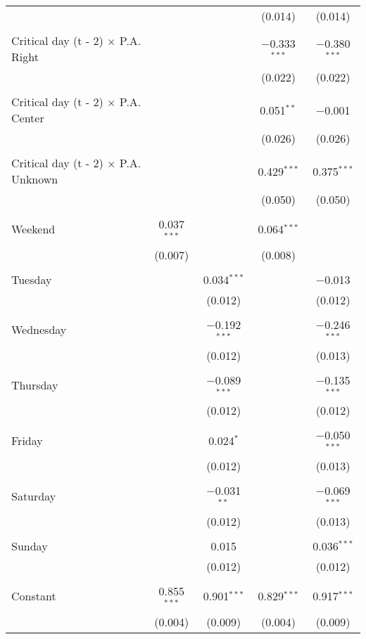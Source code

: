 \documentclass[
]{article}
\begin{document}
\begin{table}[!htbp]
{\begin{tabular}{@{\extracolsep{5pt}}lcccc}
  &  &  & (0.014) & (0.014) \\ 
  & & & & \\ 
 Critical day (t - 2) $\times$ P.A. Right &  &  & $-$0.333$^{***}$ & $-$0.380$^{***}$ \\ 
  &  &  & (0.022) & (0.022) \\ 
  & & & & \\ 
 Critical day (t - 2) $\times$ P.A. Center &  &  & 0.051$^{**}$ & $-$0.001 \\ 
  &  &  & (0.026) & (0.026) \\ 
  & & & & \\ 
 Critical day (t - 2) $\times$ P.A. Unknown &  &  & 0.429$^{***}$ & 0.375$^{***}$ \\ 
  &  &  & (0.050) & (0.050) \\ 
  & & & & \\ 
 Weekend & 0.037$^{***}$ &  & 0.064$^{***}$ &  \\ 
  & (0.007) &  & (0.008) &  \\ 
  & & & & \\ 
 Tuesday &  & 0.034$^{***}$ &  & $-$0.013 \\ 
  &  & (0.012) &  & (0.012) \\ 
  & & & & \\ 
 Wednesday &  & $-$0.192$^{***}$ &  & $-$0.246$^{***}$ \\ 
  &  & (0.012) &  & (0.013) \\ 
  & & & & \\ 
 Thursday &  & $-$0.089$^{***}$ &  & $-$0.135$^{***}$ \\ 
  &  & (0.012) &  & (0.012) \\ 
  & & & & \\ 
 Friday &  & 0.024$^{*}$ &  & $-$0.050$^{***}$ \\ 
  &  & (0.012) &  & (0.013) \\ 
  & & & & \\ 
 Saturday &  & $-$0.031$^{**}$ &  & $-$0.069$^{***}$ \\ 
  &  & (0.012) &  & (0.013) \\ 
  & & & & \\ 
 Sunday &  & 0.015 &  & 0.036$^{***}$ \\ 
  &  & (0.012) &  & (0.012) \\ 
  & & & & \\ 
 Constant & 0.855$^{***}$ & 0.901$^{***}$ & 0.829$^{***}$ & 0.917$^{***}$ \\ 
  & (0.004) & (0.009) & (0.004) & (0.009) \\ 

\end{tabular}}
\end{table}
\end{document}
